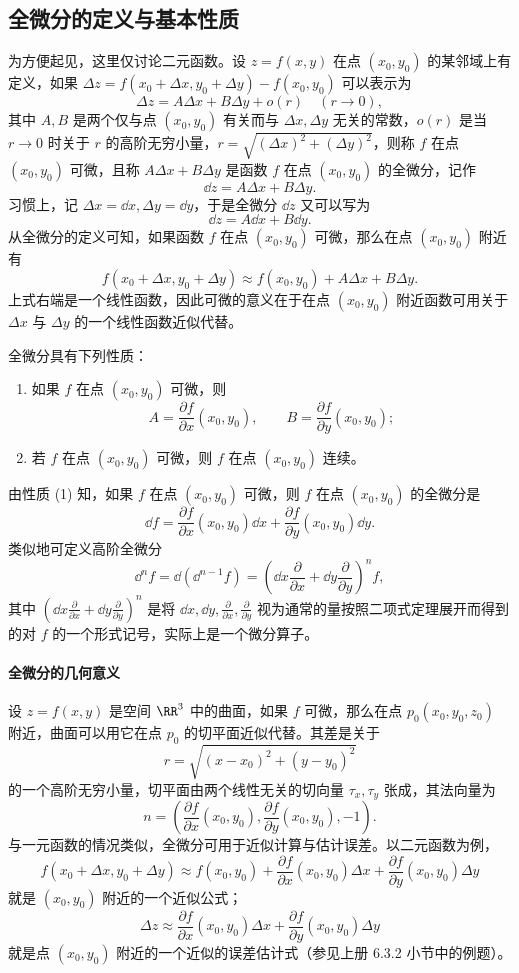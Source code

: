 \subsection{全微分的定义与基本性质}

为方便起见，这里仅讨论二元函数。设 $z=f(x,y)$ 在点 $(x_0,y_0)$ 的某邻域上有定义，如果 $\Delta z=f(x_0+\Delta x,y_0+\Delta y)-f(x_0,y_0)$ 可以表示为
\[
  \Delta z=A\Delta x+B\Delta y+o(r)\quad(r\to0),
\]
其中 $A,B$ 是两个仅与点 $(x_0,y_0)$ 有关而与 $\Delta x,\Delta y$ 无关的常数，$o(r)$ 是当 $r\to0$ 时关于 $r$ 的高阶无穷小量，$r=\sqrt{(\Delta x)^2+(\Delta y)^2}$，则称 $f$ 在点 $(x_0,y_0)$ 可微，且称 $A\Delta x+B\Delta y$ 是函数 $f$ 在点 $(x_0,y_0)$ 的全微分，记作
\[
  \dd z=A\Delta x+B\Delta y.
\]
习惯上，记 $\Delta x=\dd x,\Delta y=\dd y$，于是全微分 $\dd z$ 又可以写为
\[
  \dd z=A\dd x+B\dd y.
\]
从全微分的定义可知，如果函数 $f$ 在点 $(x_0,y_0)$ 可微，那么在点 $(x_0,y_0)$ 附近有
\[
  f(x_0+\Delta x,y_0+\Delta y)\approx f(x_0,y_0)+A\Delta x+B\Delta y.
\]
上式右端是一个线性函数，因此可微的意义在于在点 $(x_0,y_0)$ 附近函数可用关于 $\Delta x$ 与 $\Delta y$ 的一个线性函数近似代替。

全微分具有下列性质：
\begin{enumerate}[label=(\arabic*)]
  \item 如果 $f$ 在点 $(x_0,y_0)$ 可微，则
  \[
    A=\frac{\partial f}{\partial x}(x_0,y_0),\qquad
    B=\frac{\partial f}{\partial y}(x_0,y_0);
  \]
  \item 若 $f$ 在点 $(x_0,y_0)$ 可微，则 $f$ 在点 $(x_0,y_0)$ 连续。
\end{enumerate}
由性质 (1) 知，如果 $f$ 在点 $(x_0,y_0)$ 可微，则 $f$ 在点 $(x_0,y_0)$ 的全微分是
\[
  \dd f=\frac{\partial f}{\partial x}(x_0,y_0)\dd x
  +\frac{\partial f}{\partial y}(x_0,y_0)\dd y.
\]
类似地可定义高阶全微分
\[
  \dd^n f=\dd(\dd^{n-1}f)
  =\left(\dd x\frac{\partial}{\partial x}+\dd y\frac{\partial}{\partial y}\right)^n f,
\]
其中 $\left(\dd x\frac{\partial}{\partial x}+\dd y\frac{\partial}{\partial y}\right)^n$ 是将 $\dd x,\dd y,\frac{\partial}{\partial x},\frac{\partial}{\partial y}$ 视为通常的量按照二项式定理展开而得到的对 $f$ 的一个形式记号，实际上是一个微分算子。

\paragraph{全微分的几何意义}
设 $z=f(x,y)$ 是空间 $\RR^3$ 中的曲面，如果 $f$ 可微，那么在点 $p_0(x_0,y_0,z_0)$ 附近，曲面可以用它在点 $p_0$ 的切平面近似代替。其差是关于
\[
  r=\sqrt{(x-x_0)^2+(y-y_0)^2}
\]
的一个高阶无穷小量，切平面由两个线性无关的切向量 $\tau_x,\tau_y$ 张成，其法向量为
\[
  n=\left(\frac{\partial f}{\partial x}(x_0,y_0),
  \frac{\partial f}{\partial y}(x_0,y_0),-1\right).
\]
与一元函数的情况类似，全微分可用于近似计算与估计误差。以二元函数为例，
\[
  f(x_0+\Delta x,y_0+\Delta y)\approx f(x_0,y_0)
  +\frac{\partial f}{\partial x}(x_0,y_0)\Delta x
  +\frac{\partial f}{\partial y}(x_0,y_0)\Delta y
\]
就是 $(x_0,y_0)$ 附近的一个近似公式；
\[
  \Delta z\approx\frac{\partial f}{\partial x}(x_0,y_0)\Delta x
  +\frac{\partial f}{\partial y}(x_0,y_0)\Delta y
\]
就是点 $(x_0,y_0)$ 附近的一个近似的误差估计式（参见上册 6.3.2 小节中的例题）。


